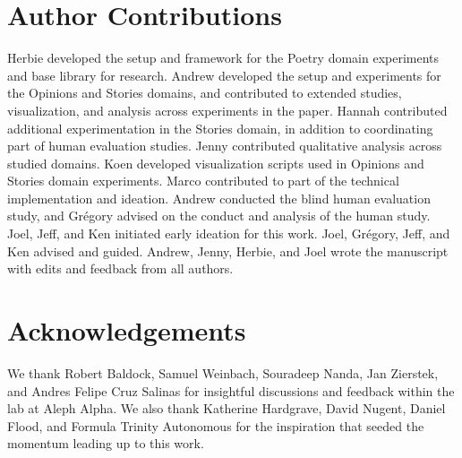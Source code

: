 \section*{Author Contributions}\label{sec:contrib}
Herbie developed the setup and framework for the Poetry domain experiments and base library for research. Andrew developed the setup and experiments for the Opinions and Stories domains, and contributed to extended studies, visualization, and analysis across experiments in the paper. Hannah contributed additional experimentation in the Stories domain, in addition to coordinating part of human evaluation studies. Jenny contributed qualitative analysis across studied domains. Koen developed visualization scripts used in Opinions and Stories domain experiments. Marco contributed to part of the technical implementation and ideation. Andrew conducted the blind human evaluation study, and Gr\'egory advised on the conduct and analysis of the human study. Joel, Jeff, and Ken initiated early ideation for this work. Joel, Gr\'egory, Jeff, and Ken advised and guided. Andrew, Jenny, Herbie, and Joel wrote the manuscript with edits and feedback from all authors.

\section*{Acknowledgements}
We thank Robert Baldock, Samuel Weinbach, Souradeep Nanda, Jan Zierstek, and Andres Felipe Cruz Salinas for insightful discussions and feedback within the lab at Aleph Alpha. We also thank Katherine Hardgrave, David Nugent, Daniel Flood, and Formula Trinity Autonomous for the inspiration that seeded the momentum leading up to this work.